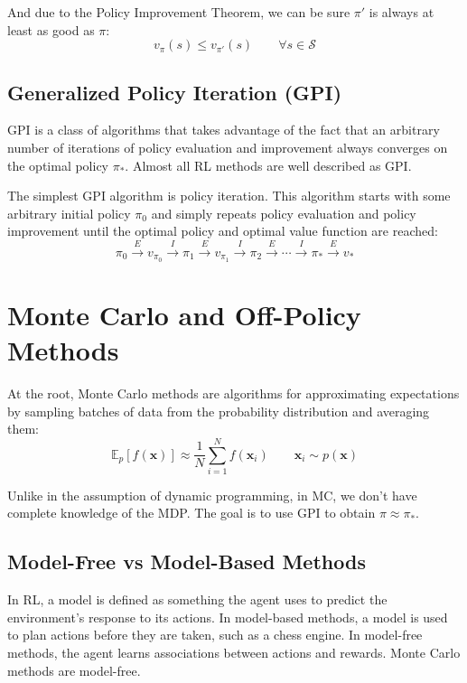 \documentclass{article}
\begin{document}
And due to the Policy Improvement Theorem, we can be sure $\pi'$ is always at least as good as $\pi$:
\begin{equation}
  v_\pi(s) \leq v_{\pi'}(s) \qquad \forall s \in \mathcal{S}
\end{equation}

\subsection{Generalized Policy Iteration (GPI)}
GPI is a class of algorithms that takes advantage of the fact that an arbitrary number of iterations of policy evaluation and improvement 
always converges on the optimal policy $\pi_*$. Almost all RL methods are well described as GPI.

The simplest GPI algorithm is policy iteration. This algorithm starts with some arbitrary initial policy $\pi_0$ and simply repeats policy evaluation 
and policy improvement until the optimal policy and optimal value function are reached:
\begin{equation}
  \pi_0 \xrightarrow{E} v_{\pi_0} \xrightarrow{I} \pi_1 \xrightarrow{E} v_{\pi_1} \xrightarrow{I} 
  \pi_2 \xrightarrow{E} \cdots \xrightarrow{I} \pi_* \xrightarrow{E} v_*
\end{equation}



\section{Monte Carlo and Off-Policy Methods}
At the root, Monte Carlo methods are algorithms for approximating expectations by sampling batches of data from the 
probability distribution and averaging them:
\begin{equation}
  \mathbb{E}_p[f(\mathbf{x})] \approx \frac{1}{N} \sum_{i=1}^{N} f(\mathbf{x}_i) \qquad \mathbf{x}_i \sim p(\mathbf{x})
\end{equation}

Unlike in the assumption of dynamic programming, in MC, we don't have complete knowledge of the MDP. 
The goal is to use GPI to obtain $\pi \approx \pi_*$. 

\subsection{Model-Free vs Model-Based Methods}
In RL, a model is defined as something the agent uses to predict the environment's response to its actions. 
In model-based methods, a model is used to plan actions before they are taken, such as a chess engine.
In model-free methods, the agent learns associations between actions and rewards. 
Monte Carlo methods are model-free.
\end{document}
